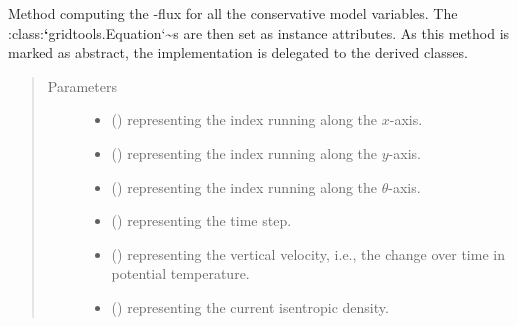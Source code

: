 \documentclass[letterpaper,10pt,english]{sphinxmanual}
\begin{document}
\begin{fulllineitems}

\begin{fulllineitems}
\label{\detokenize{api:dycore.flux_isentropic.FluxIsentropic._compute_vertical_fluxes}}
Method computing the -flux
for all the conservative model variables. The :class:{\color{red}\bfseries{}{}`}gridtools.Equation{}`\textasciitilde{}s are then
set as instance attributes.
As this method is marked as abstract, the implementation is delegated to the derived classes.
\begin{quote}\begin{description}
\item[{Parameters}] \leavevmode\begin{itemize}
\item {} 
 () \textendash{}  representing the index running along the \(x\)-axis.

\item {} 
 () \textendash{}  representing the index running along the \(y\)-axis.

\item {} 
 () \textendash{}  representing the index running along the \(\theta\)-axis.

\item {} 
 () \textendash{}  representing the time step.

\item {} 
 () \textendash{}  representing the vertical velocity,
i.e., the change over time in potential temperature.

\item {} 
 () \textendash{}  representing the current isentropic density.


\end{itemize}
\end{description}
\end{quote}
\end{fulllineitems}
\end{fulllineitems}
\end{document}
